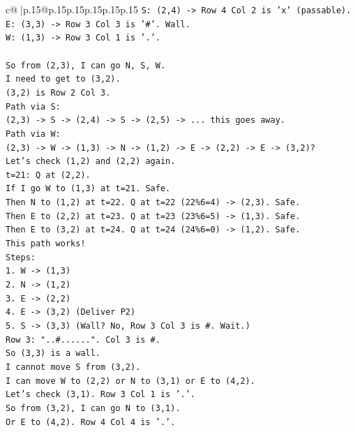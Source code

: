 \documentclass{article}
\begin{document}
{\begin{supertabular}{c@{$\;$}|p{.15\linewidth}@{}p{.15\linewidth}p{.15\linewidth}p{.15\linewidth}p{.15\linewidth}p{.15\linewidth}}
{{{\texttt{S: (2,4) {-}> Row 4 Col 2 is 'x' (passable).} \\
\texttt{E: (3,3) {-}> Row 3 Col 3 is '\#'. Wall.} \\
\texttt{W: (1,3) {-}> Row 3 Col 1 is '.'.} \\
\\ 
\texttt{So from (2,3), I can go N, S, W.} \\
\texttt{I need to get to (3,2).} \\
\texttt{(3,2) is Row 2 Col 3.} \\
\texttt{Path via S:} \\
\texttt{(2,3) {-}> S {-}> (2,4) {-}> S {-}> (2,5) {-}> ... this goes away.} \\
\texttt{Path via W:} \\
\texttt{(2,3) {-}> W {-}> (1,3) {-}> N {-}> (1,2) {-}> E {-}> (2,2) {-}> E {-}> (3,2)?} \\
\texttt{Let's check (1,2) and (2,2) again.} \\
\texttt{t=21: Q at (2,2).} \\
\texttt{If I go W to (1,3) at t=21. Safe.} \\
\texttt{Then N to (1,2) at t=22. Q at t=22 (22\%6=4) {-}> (2,3). Safe.} \\
\texttt{Then E to (2,2) at t=23. Q at t=23 (23\%6=5) {-}> (1,3). Safe.} \\
\texttt{Then E to (3,2) at t=24. Q at t=24 (24\%6=0) {-}> (1,2). Safe.} \\
\texttt{This path works!} \\
\texttt{Steps:} \\
\texttt{1. W {-}> (1,3)} \\
\texttt{2. N {-}> (1,2)} \\
\texttt{3. E {-}> (2,2)} \\
\texttt{4. E {-}> (3,2) (Deliver P2)} \\
\texttt{5. S {-}> (3,3) (Wall? No, Row 3 Col 3 is \#. Wait.)} \\
\texttt{Row 3: "..\#......". Col 3 is \#.} \\
\texttt{So (3,3) is a wall.} \\
\texttt{I cannot move S from (3,2).} \\
\texttt{I can move W to (2,2) or N to (3,1) or E to (4,2).} \\
\texttt{Let's check (3,1). Row 3 Col 1 is '.'.} \\
\texttt{So from (3,2), I can go N to (3,1).} \\
\texttt{Or E to (4,2). Row 4 Col 4 is '.'.} \\
}}}
\end{supertabular}}
\end{document}
